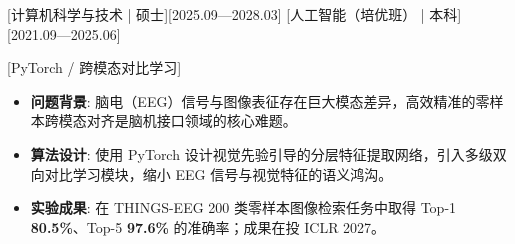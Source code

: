 [\textnormal{计算机科学与技术 | 硕士}][2025.09—2028.03]
[\textnormal{人工智能（培优班） | 本科}][2021.09—2025.06]

[PyTorch / 跨模态对比学习]
\begin{itemize}
\item \textbf{问题背景}: 脑电（EEG）信号与图像表征存在巨大模态差异，高效精准的零样本跨模态对齐是脑机接口领域的核心难题。
\item \textbf{算法设计}: 使用 PyTorch 设计视觉先验引导的分层特征提取网络，引入多级双向对比学习模块，缩小 EEG 信号与视觉特征的语义鸿沟。
\item \textbf{实验成果}: 在 THINGS-EEG 200 类零样本图像检索任务中取得 Top-1 \textbf{80.5\%}、Top-5 \textbf{97.6\%} 的准确率；成果在投 ICLR 2027。
\end{itemize}
